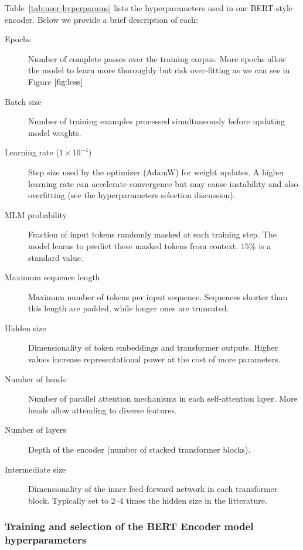 \documentclass{article}
\begin{document}
Table~\ref{tab:user-hyperparams} lists the hyperparameters used in our BERT‐style encoder. Below we provide a brief description of each:

\begin{description}
  \item[Epochs]  
    Number of complete passes over the training corpus.  More epochs allow the model to learn more thoroughly but risk over‐fitting as we can see in Figure $\ref{fig:loss}$

  \item[Batch size]  
    Number of training examples processed simultaneously before updating model weights.  

  \item[Learning rate ($1\times10^{-4}$)]  
    Step size used by the optimizer (AdamW) for weight updates.  
    A higher learning rate can accelerate convergence but may cause instability and also overfitting (see the hyperparameters selection discussion).

  \item[MLM probability]  
    Fraction of input tokens randomly masked at each training step.  The model learns to predict these masked tokens from context. $15 \%$ is a standard value.

  \item[Maximum sequence length]  
    Maximum number of tokens per input sequence.  
    Sequences shorter than this length are padded, while longer ones are truncated.  

  \item[Hidden size]  
    Dimensionality of token embeddings and transformer outputs.  Higher values increase representational power at the cost of more parameters.

  \item[Number of heads]  
    Number of parallel attention mechanisms in each self‐attention layer. More heads allow attending to diverse features.

  \item[Number of layers ]  
    Depth of the encoder (number of stacked transformer blocks).  

  \item[Intermediate size ]  
    Dimensionality of the inner feed‐forward network in each transformer block.  
    Typically set to 2–4 times the hidden size in the litterature.  
\end{description}


\subsubsection{Training and selection of the BERT Encoder model hyperparameters}
\end{document}
